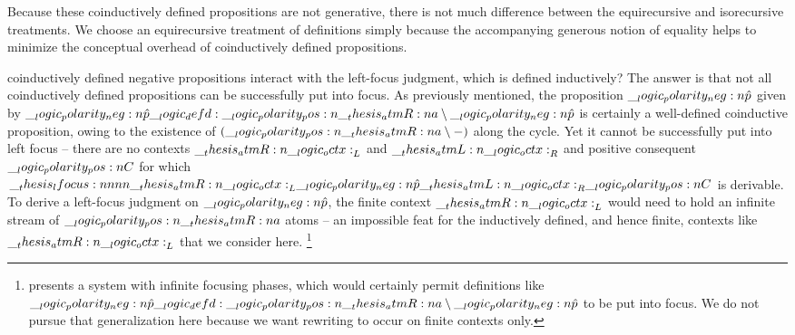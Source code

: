 Because these coinductively defined propositions are not generative\autocite{??}, there is not much difference between the equirecursive and isorecursive treatments.
We choose an equirecursive treatment of definitions simply because the accompanying generous notion of equality helps to minimize the conceptual overhead of coinductively defined propositions.

 coinductively defined negative propositions interact with the left-focus judgment, which is defined inductively?
The answer is that not all coinductively defined propositions can be successfully put into focus.
As previously mentioned, the proposition $\__logic_polarity_neg:n {\hat{p}}$ given by $\__logic_polarity_neg:n {\hat{p}} \__logic_defd: \__logic_polarity_pos:n {\__thesis_atmR:n {a}} \mathbin { \setminus } \__logic_polarity_neg:n {\hat{p}}$ is certainly a well-defined coinductive proposition, owing to the existence of $(\__logic_polarity_pos:n {\__thesis_atmR:n {a}} \mathbin { \setminus } \mathord{-})$ along the cycle.
Yet it cannot be successfully put into left focus -- there are no contexts $\__thesis_atmR:n {\__logic_octx:}_L$ and $\__thesis_atmL:n {\__logic_octx:}_R$ and positive consequent $\__logic_polarity_pos:n {C}$ for which $\__thesis_lfocus:nnnn {\__thesis_atmR:n {\__logic_octx:}_L} {\__logic_polarity_neg:n {\hat{p}}} {\__thesis_atmL:n {\__logic_octx:}_R} {\__logic_polarity_pos:n {C}}$ is derivable.
To derive a left-focus judgment on $\__logic_polarity_neg:n {\hat{p}}$, the finite context $\__thesis_atmR:n {\__logic_octx:}_L$ would need to hold an infinite stream of $\__logic_polarity_pos:n {\__thesis_atmR:n {a}}$ atoms -- an impossible feat for the inductively defined, and hence finite, contexts like $\__thesis_atmR:n {\__logic_octx:}_L$ that we consider here.%
\footnote{%
  \Textcite{Miller:??} presents a system with infinite focusing phases, which would certainly permit definitions like $\__logic_polarity_neg:n {\hat{p}} \__logic_defd: \__logic_polarity_pos:n {\__thesis_atmR:n {a}} \mathbin { \setminus } \__logic_polarity_neg:n {\hat{p}}$ to be put into focus.
  We do not pursue that generalization here because we want rewriting to occur on finite contexts only.}


